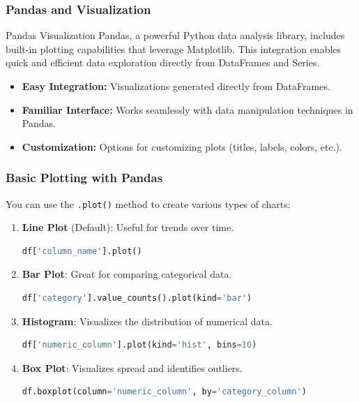 \documentclass{beamer}
\begin{document}
\begin{frame}[fragile]
    \frametitle{Pandas and Visualization}
    \begin{block}{Pandas Visualization}
        Pandas, a powerful Python data analysis library, includes built-in plotting capabilities that leverage Matplotlib. This integration enables quick and efficient data exploration directly from DataFrames and Series.
    \end{block}
    
    \begin{itemize}
        \item \textbf{Easy Integration:} Visualizations generated directly from DataFrames.
        \item \textbf{Familiar Interface:} Works seamlessly with data manipulation techniques in Pandas.
        \item \textbf{Customization:} Options for customizing plots (titles, labels, colors, etc.).
    \end{itemize}
\end{frame}

\begin{frame}[fragile]
    \frametitle{Basic Plotting with Pandas}
    You can use the \texttt{.plot()} method to create various types of charts:
    
    \begin{enumerate}
        \item \textbf{Line Plot} (Default): Useful for trends over time.
            \begin{lstlisting}[language=Python]
df['column_name'].plot()
            \end{lstlisting}
            
        \item \textbf{Bar Plot}: Great for comparing categorical data.
            \begin{lstlisting}[language=Python]
df['category'].value_counts().plot(kind='bar')
            \end{lstlisting}
            
        \item \textbf{Histogram}: Visualizes the distribution of numerical data.
            \begin{lstlisting}[language=Python]
df['numeric_column'].plot(kind='hist', bins=10)
            \end{lstlisting}
            
        \item \textbf{Box Plot}: Visualizes spread and identifies outliers.
            \begin{lstlisting}[language=Python]
df.boxplot(column='numeric_column', by='category_column')
            \end{lstlisting}
    \end{enumerate}
\end{frame}
\end{document}
